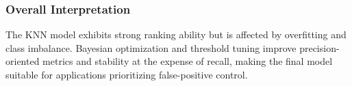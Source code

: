 \subsubsection{Overall Interpretation}
The KNN model exhibits strong ranking ability but is affected by overfitting and class imbalance. Bayesian optimization and threshold tuning improve precision-oriented metrics and stability at the expense of recall, making the final model suitable for applications prioritizing false-positive control.
